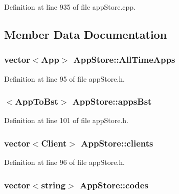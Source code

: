 Definition at line 935 of file app\-Store.\-cpp.



\subsection{Member Data Documentation}
\hypertarget{class_app_store_a4c7200eb18f1154bbe578840b89ad023}{
\subsubsection[{All\-Time\-Apps}]{\setlength{\rightskip}{0pt plus 5cm}vector$<${\bf App}$>$ App\-Store\-::\-All\-Time\-Apps}}\label{class_app_store_a4c7200eb18f1154bbe578840b89ad023}


Definition at line 95 of file app\-Store.\-h.

\hypertarget{class_app_store_a7f44ee43df1c309a54e3e66cb6b492ab}{
\subsubsection[{apps\-Bst}]{$<${\bf App\-To\-Bst}$>$ App\-Store\-::apps\-Bst}}\label{class_app_store_a7f44ee43df1c309a54e3e66cb6b492ab}


Definition at line 101 of file app\-Store.\-h.

\hypertarget{class_app_store_adf4a143f08087c4b33b6e8de35c4c281}{
\subsubsection[{clients}]{\setlength{\rightskip}{0pt plus 5cm}vector$<${\bf Client}$>$ App\-Store\-::clients}}\label{class_app_store_adf4a143f08087c4b33b6e8de35c4c281}


Definition at line 96 of file app\-Store.\-h.

\hypertarget{class_app_store_abf1964222fb315f15c29b9011e457109}{
\subsubsection[{codes}]{\setlength{\rightskip}{0pt plus 5cm}vector$<$string$>$ App\-Store\-::codes}}\label{class_app_store_abf1964222fb315f15c29b9011e457109}


